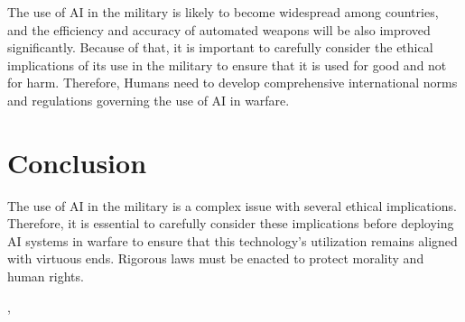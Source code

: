 \documentclass{article}
\begin{document}
The use of AI in the military is likely to become widespread among countries, and the efficiency and accuracy of automated weapons will be also improved significantly. Because of that, it is important to carefully consider the ethical implications of its use in the military to ensure that it is used for good and not for harm. Therefore, Humans need to develop comprehensive international norms and regulations governing the use of AI in warfare.

\section{Conclusion}
The use of AI in the military is a complex issue with several ethical implications. Therefore, it is essential to carefully consider these implications before deploying AI systems in warfare to ensure that this technology's utilization remains aligned with virtuous ends. Rigorous laws must be enacted to protect morality and human rights.


\cite{Kessel2019nytimes}, \cite{2020Military}

\printbibliography





\end{document}
